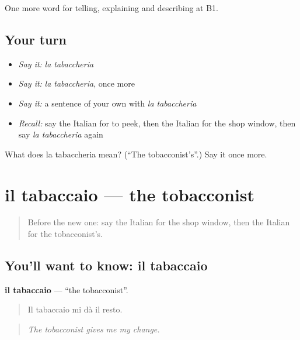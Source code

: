 \begin{grammarlens}[title={What you've built}]
One more word for telling, explaining and describing at B1.
\end{grammarlens}

\subsection*{Your turn}
\begin{itemize}
\raggedright
  \item \emph{Say it:} \emph{la tabaccheria}
  \item \emph{Say it:} \emph{la tabaccheria}, once more
  \item \emph{Say it:} a sentence of your own with \emph{la tabaccheria}
  \item \emph{Recall:} say the Italian for to peek, then the Italian for the shop window, then say \emph{la tabaccheria} again
\end{itemize}

\begin{tcolorbox}[breakable,colback=teal!4,colframe=teal!35!black,title={Before you move on}]
What does la tabaccheria mean? (\textquotedblleft{}The tobacconist's\textquotedblright{}.) Say it once more.
\end{tcolorbox}
\section[il tabaccaio]{il tabaccaio — the tobacconist}

\label{lesson:IT-C452-tabaccaio}



\begin{quote}
Before the new one: say the Italian for the shop window, then the Italian for the tobacconist's.
\end{quote}

\subsection*{You'll want to know: il tabaccaio}
\textbf{il tabaccaio} — \textquotedblleft{}the tobacconist\textquotedblright{}.

\begin{quote}
Il tabaccaio mi dà il resto.
\end{quote}

\begin{quote}
\emph{The tobacconist gives me my change.}
\end{quote}


